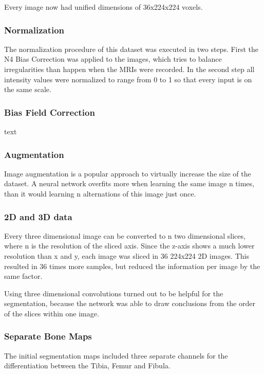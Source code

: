 Every image now had unified dimensions of 36x224x224 voxels.

\subsubsection{Normalization}

The normalization procedure of this dataset was executed in two steps. First the N4 Bias Correction was applied to the images, which tries to balance irregularities than happen when the MRIs were recorded. In the second step all intensity values were normalized to range from 0 to 1 so that every input is on the same scale.

\subsubsection{Bias Field Correction}

text

\subsubsection{Augmentation}

Image augmentation is a popular approach to virtually increase the size of the dataset. A neural network overfits more when learning the same image n times, than it would learning n alternations of this image just once.



\subsubsection{2D and 3D data}

Every three dimensional image can be converted to n two dimensional slices, where n is the resolution of the sliced axis. Since the z-axis shows a much lower resolution than x and y, each image was sliced in 36 224x224 2D images. This resulted in 36 times more samples, but reduced the information per image by the same factor. 

Using three dimensional convolutions turned out to be helpful for the segmentation, because the network was able to draw conclusions from the order of the slices within one image. 

\subsubsection{Separate Bone Maps}

The initial segmentation maps included three separate channels for the differentiation between the Tibia, Femur and Fibula. 

